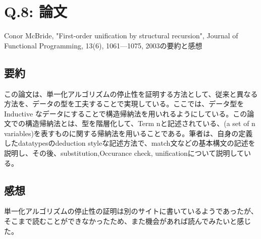 \documentclass[uplatex,12pt]{jsarticle}
\begin{document}
\section{Q.8: 論文}
Conor McBride, "First-order unification by structural recursion", Journal of Functional Programming, 13(6), 1061—1075, 2003の要約と感想
\subsection{要約}
この論文は、単一化アルゴリズムの停止性を証明する方法として、従来と異なる方法を、データの型を工夫することで実現している。ここでは、データ型をInductive なデータにすることで構造帰納法を用いれるようにしている。この論文での構造帰納法とは、型を階層化して、Term nと記述されている、(a set of n variables)を表すものに関する帰納法を用いることである。筆者は、自身の定義したdatatypesのdeduction styleな記述方法で、match文などの基本構文の記述を説明し、その後、substitution,Occurance check, unificationについて説明している。

\subsection{感想}
単一化アルゴリズムの停止性の証明は別のサイトに書いているようであったが、そこまで読むことができなかったため、また機会があれば読んでみたいと感じた。
\end{document}
